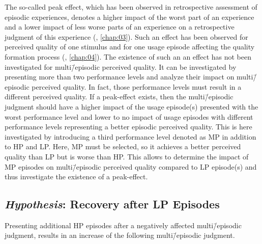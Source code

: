 The so-called peak effect, which has been observed in retrospective assessment of episodic experiences, denotes a higher impact of the worst part of an experience and a lower impact of less worse parts of an experience on a retrospective judgment of this experience (\cf, \autoref{chap:03}).
Such an effect has been observed for perceived quality of one stimulus and for one usage episode affecting the quality formation process (\cf, \autoref{chap:04}).
The existence of such an an effect has not been investigated for multi\=/episodic perceived quality.
It can be investigated by presenting more than two performance levels and analyze their impact on multi\=/episodic perceived quality.
In fact, those performance levels must result in a different perceived quality.
If a peak-effect exists, then the multi\=/episodic judgment should have a higher impact of the usage episode(s) presented with the worst performance level and lower to no impact of usage episodes with different performance levels representing a better episodic perceived quality.
This is here investigated by introducing a third performance level denoted as \ac{MP} in addition to \ac{HP} and \ac{LP}.
Here, \ac{MP} must be selected, so it achieves a better perceived quality than \ac{LP} but is worse than \ac{HP}.
This allows to determine the impact of \ac{MP} episodes on multi\=/episodic perceived quality compared to \ac{LP} episode(s) and thus investigate the existence of a peak-effect.



\subsection[H5: Recovery after \acs{LP} Episodes]{\emph{Hypothesis}: Recovery after \acs{LP} Episodes}
\begin{hypothesis}\label{hypo:recovery}
Presenting additional \ac{HP} episodes after a negatively affected multi\=/episodic judgment, results in an increase of the following multi\=/episodic judgment.
\end{hypothesis}

